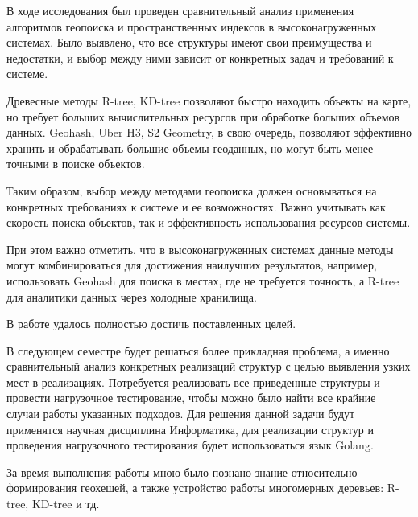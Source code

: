 \Conclusion

В ходе исследования был проведен сравнительный анализ применения алгоритмов геопоиска и пространственных индексов в высоконагруженных системах. Было выявлено, что все структуры имеют свои преимущества и недостатки, и выбор между ними зависит от конкретных задач и требований к системе.

Древесные методы R-tree, KD-tree позволяют быстро находить объекты на карте, но требует больших вычислительных ресурсов при обработке больших объемов данных. Geohash, Uber H3, S2 Geometry, в свою очередь, позволяют эффективно хранить и обрабатывать большие объемы геоданных, но могут быть менее точными в поиске объектов.

Таким образом, выбор между методами геопоиска должен основываться на конкретных требованиях к системе и ее возможностях. Важно учитывать как скорость поиска объектов, так и эффективность использования ресурсов системы.

При этом важно отметить, что в высоконагруженных системах данные методы могут комбинироваться для достижения наилучших результатов, например, использовать Geohash для поиска в местах, где не требуется точность, а R-tree для аналитики данных через холодные хранилища.

В работе удалось полностью достичь поставленных целей. 

В следующем семестре будет решаться более прикладная проблема, а именно сравнительный анализ конкретных реализаций структур с целью выявления узких мест в реализациях. Потребуется реализовать все приведенные структуры и провести нагрузочное тестирование, чтобы можно было найти все крайние случаи работы указанных подходов. Для решения данной задачи будут применятся научная дисциплина Информатика, для реализации структур и проведения нагрузочного тестирования будет использоваться язык Golang.

За время выполнения работы мною было познано знание относительно формирования геохешей, а также устройство работы многомерных деревьев: R-tree, KD-tree и тд.
